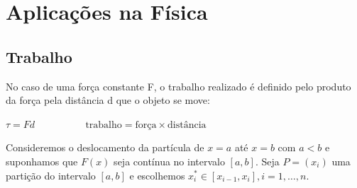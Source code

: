 \cleardoublepage\documentclass[../main.tex]{subfiles}
\begin{document}
 

\section{Aplicações na Física}\label{AplicFisica}
\subsection{Trabalho}\label{subsec:AplicTrabalho}
No caso de uma força constante F, o trabalho realizado é definido pelo produto da força pela distância d que o objeto se move:
\begin{center}
    $\tau=Fd\hspace{2cm}\text{ trabalho}=\text{força} \times \text{distância}$
\end{center}

Consideremos o deslocamento da partícula de $x = a$ até $x = b$ com \(a < b\) e suponhamos que \(F(x) \) seja
contínua no intervalo \([a,b]\). Seja \(P = (x_i)\) uma partição do intervalo \([a,b]\) e escolhemos \(x_i^*\in [x_{i-1}, x_i],  i = 1, \ldots,n\).
\end{document}
